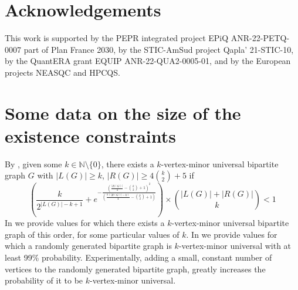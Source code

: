 \documentclass[a4paper,UKenglish,cleveref, autoref, thm-restate]{arxiv}
\newcommand{\gs}{\geqslant}
\begin{document}
 \section*{Acknowledgements}
This work is supported by the PEPR integrated project EPiQ ANR-22-PETQ-0007 part of Plan France 2030, by the STIC-AmSud project Qapla’ 21-STIC-10, by the QuantERA grant EQUIP ANR-22-QUA2-0005-01, and by the European projects NEASQC and HPCQS.



\appendix


\section{Some data on the size of the existence constraints}

By , given some $k\in \mathbb N\setminus\{0\}$, there exists a $k$-vertex-minor universal bipartite graph $G$ with $|L(G)|\gs k$, $|R(G)|\gs4{k \choose 2}+5$ if $$ \left( \frac{k}{2^{|L(G)|-k+1}} + e^{-\frac{\left(\frac{|R(G)|}{4}-{k \choose 2}+1\right)^2}{\left(\frac{7(|R(G)|-k)}{4}-{k \choose 2}+1\right)}}\right)\times {|L(G)|+|R(G)| \choose k} < 1$$
In  we provide values for which there exists a $k$-vertex-minor universal bipartite graph of this order, for some particular values of $k$. In  we provide values for which a randomly generated bipartite graph is $k$-vertex-minor universal with at least 99\% probability. Experimentally, adding a small, constant number of vertices to the randomly generated bipartite graph, greatly increases the probability of it to be $k$-vertex-minor universal.


\label{app:table}
\end{document}
